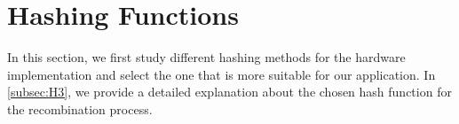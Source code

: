 
\section{Hashing Functions} \label{sec:hashing}
In this section, we first study different hashing methods for the hardware implementation and select the one that is more suitable for our application. In \ref{subsec:H3}, we provide a detailed explanation about the chosen hash function for the recombination process. 


